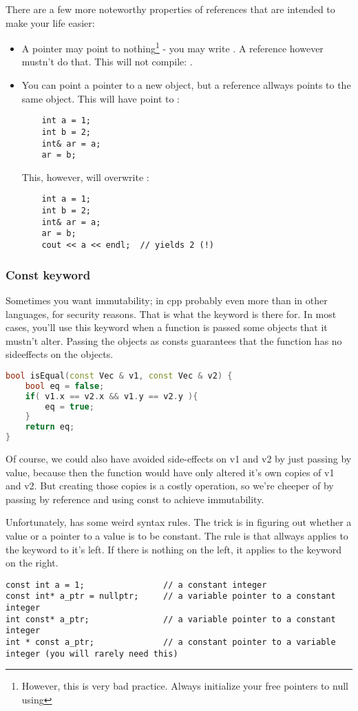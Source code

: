 There are a few more noteworthy properties of references that are intended to make your life easier:
\begin{itemize}
    \item A pointer may point to nothing\footnote{However, this is very bad practice. Always initialize your free pointers to null using } - you may write . A reference however mustn't do that. This will not compile: .
    \item You can point a pointer to a new object, but a reference allways points to the same object. This will have  point to : 
    \begin{lstlisting}
    int a = 1; 
    int b = 2; 
    int& ar = a; 
    ar = b;
    \end{lstlisting}
    This, however, will overwrite : 
    \begin{lstlisting}
    int a = 1; 
    int b = 2; 
    int& ar = a; 
    ar = b;
    cout << a << endl;  // yields 2 (!)
    \end{lstlisting}
\end{itemize}
\subsubsection{Const keyword}
Sometimes you want immutability; in cpp probably even more than in other languages, for security reasons. That is what the  keyword is there for. In most cases, you'll use this keyword when a function is passed some objects that it mustn't alter. Passing the objects as consts guarantees that the function has no sideeffects on the objects. 
\begin{lstlisting}[language=c++]
bool isEqual(const Vec & v1, const Vec & v2) {
    bool eq = false;
    if( v1.x == v2.x && v1.y == v2.y ){
        eq = true;
    }
    return eq;
}
\end{lstlisting}

Of course, we could also have avoided side-effects on v1 and v2 by just passing by value, because then the function would have only altered it's own copies of v1 and v2. But creating those copies is a costly operation, so we're cheeper of by passing by reference and using const to achieve immutability. 

Unfortunately,  has some weird syntax rules. The trick is in figuring out whether a value or a pointer to a value is to be constant. The rule is that  allways applies to the keyword to it's left. If there is nothing on the left, it applies to the keyword on the right. 
\begin{lstlisting}
const int a = 1;                // a constant integer
const int* a_ptr = nullptr;     // a variable pointer to a constant integer
int const* a_ptr;               // a variable pointer to a constant integer
int * const a_ptr;              // a constant pointer to a variable integer (you will rarely need this)
\end{lstlisting}




